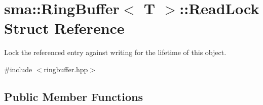\hypertarget{structsma_1_1RingBuffer_1_1ReadLock}{\section{sma\-:\-:Ring\-Buffer$<$ T $>$\-:\-:Read\-Lock Struct Reference}
\label{structsma_1_1RingBuffer_1_1ReadLock}
}


Lock the referenced entry against writing for the lifetime of this object.  




{\ttfamily \#include $<$ringbuffer.\-hpp$>$}

\subsection*{Public Member Functions}
